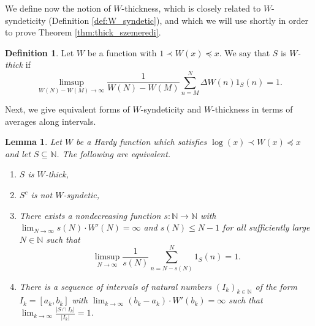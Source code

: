\documentclass[12pt]{article}
\theoremstyle{plain} %
\newtheorem{lemma}[theorem]{Lemma}
\theoremstyle{definition} %
\newtheorem{definition}[theorem]{Definition}
\theoremstyle{plain}
\theoremstyle{plain}
\numberwithin{equation}{section}
\newcommand{\N}{\mathbb{N}}
\renewcommand{\leq}{\leqslant}
\renewcommand{\subset}{\subseteq}
\newcommand{\1}{\mathbbm{1}}
\newcommand{\oo}{\infty}
\begin{document}
We define now the notion of $W$-thickness, which is closely related to $W$-syndeticity (Definition \ref{def:W_syndetic}), and which we will use shortly in order to prove Theorem \ref{thm:thick_szemeredi}.

\begin{definition}\label{def:W_thick}
    Let $W$ be a function with $1\prec W(x)\preceq x$. We say that $S$ is $W$\emph{-thick} if 
    \begin{equation}
        \limsup_{W(N)-W(M)\to\oo}\frac{1}{W(N)-W(M)}\sum_{n=M}^N\Delta W(n)1_{S}(n)=1.
    \end{equation}
\end{definition}
Next, we give equivalent forms of $W$-syndeticity and $W$-thickness in terms of averages along intervals.
\begin{lemma}\label{lem:W_syndetic_equivalence}
     Let $W$ be a Hardy function which satisfies $\log(x)\prec W(x)\preceq x$ and let $S\subset \N$. The following are equivalent.
    \begin{enumerate}[label = (\roman*)]
        \item $S$ is $W$-thick,
        \item $S^c$ is not $W$-syndetic,
        \item There exists a nondecreasing function $s:\N\rightarrow \N$ with $\lim_{N\to\oo}s(N)\cdot  W'(N)=\oo$ and $s(N)\leq N-1$ for all sufficiently large $N\in \N$ such that   $$
        \limsup_{N\to\oo}\frac{1}{s(N)}\sum_{n=N-s(N)}^{N}1_S(n)=1.
        $$
        \item There is a sequence of intervals of natural numbers $(I_k)_{k\in \N}$ of the form $I_k  = [a_k,b_k]$ with $\lim_{k\to\oo}(b_k-a_k)\cdot W'(b_k) = \oo$ such that $\lim_{k\to\oo}\frac{|S\cap I_k|}{|I_k|}=1$.
    \end{enumerate}
\end{lemma}
\end{document}
